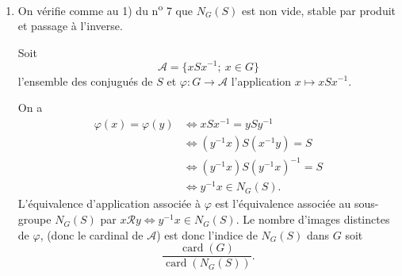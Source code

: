 \begin{enumerate}[label=\arabic*.,leftmargin=2.2em,itemsep=1.2em]
\begin{enumerate}[label=\arabic*),leftmargin=2em]
La relation binaire
\[
x\mathcal S y\Longleftrightarrow xax^{-1}=yay^{-1}
\]
est une relation d'équivalence sur $G$, compatible à gauche car si $x\mathcal S y$, pour tout $t$ de $G$ on a
\[
txax^{-1}t^{-1}=tyay^{-1}t^{-1}
\]
soit $(tx)\mathcal S(ty)$. La classe d'équivalence de $e$ est l'ensemble des $x$ tels que $xax^{-1}=eae^{-1}=a$, c'est le stabilisateur $H_a$ de $a$, la classe d'équivalence de $x$ est donc $x\cdot H_a$, elle est équipotente à $H_a$, donc la partition de $G$ en classes d'équivalences donne
\[
\operatorname{card}(G)=\operatorname{card}(G/\mathcal S)\cdot\operatorname{card}(H_a),
\qquad
\operatorname{card}(G/\mathcal S)=\frac{\operatorname{card}(G)}{\operatorname{card}(H_a)}:
\]
c'est bien l'indice du stabilisateur de $a$.

Comme le nombre de conjugués différents de $a$ correspond au nombre de classes d'équivalence, on a bien le résultat.

\item Par automorphisme intérieur, l'orbite de $a$ est de cardinal 1 si et seulement si, $\forall h\in G$, $hah^{-1}=a$, soit $ha=ah$, soit encore si et seulement si $a$ est dans le centre $Z$ de $G$.

L'équation aux classes donne donc :
\[
\operatorname{card}(G)=p^m=\operatorname{card}Z+
\sum(\text{cardinaux des orbites des }a\notin Z).
\]
Mais si $a\notin Z$, l'orbite de $a$ admet l'indice de $H_a$ comme cardinal, d'après le 1), cet indice est un diviseur de $p^m$, donc du type $p^k$ avec $k\ge1$, (sinon $a\in Z$). La somme des cardinaux des orbites des $a\notin Z$ est divisible par $p$, premier, donc card $Z$ est aussi divisible par $p$ : d'où
\[
\operatorname{card}Z=p^q\quad\text{avec }0<q\le m,
\]
puisque c'est un sous-groupe de $G$, (donc divise $p^m$) et qu'il est multiple de $p$.
\end{enumerate}

\item On vérifie comme au 1) du n\textsuperscript{o} 7 que $N_G(S)$ est non vide, stable par produit et passage à l'inverse.

Soit
\[
\mathcal A=\{xSx^{-1};\ x\in G\}
\]
l'ensemble des conjugués de $S$ et $\varphi:G\longrightarrow\mathcal A$ l'application $x\longmapsto xSx^{-1}$.

On a
\begin{align*}
\varphi(x)=\varphi(y)
&\Longleftrightarrow xSx^{-1}=ySy^{-1}\\
&\Longleftrightarrow (y^{-1}x)S(x^{-1}y)=S\\
&\Longleftrightarrow (y^{-1}x)S(y^{-1}x)^{-1}=S\\
&\Longleftrightarrow y^{-1}x\in N_G(S).
\end{align*}
L'équivalence d'application associée à $\varphi$ est l'équivalence associée au sous-groupe $N_G(S)$ par $x\mathcal R y\Longleftrightarrow y^{-1}x\in N_G(S)$. Le nombre d'images distinctes de $\varphi$, (donc le cardinal de $\mathcal A$) est donc l'indice de $N_G(S)$ dans $G$ soit
\[
\frac{\operatorname{card}(G)}{\operatorname{card}(N_G(S))}.
\]


\end{enumerate}
